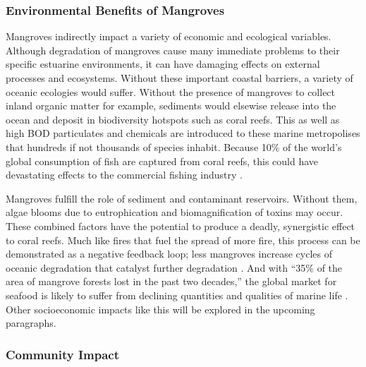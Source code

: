 \subsubsection{Environmental Benefits of Mangroves}

Mangroves indirectly impact a variety of economic and ecological variables. Although degradation of mangroves cause many immediate problems to their specific estuarine environments, it can have damaging effects on external processes and ecosystems. Without these  important coastal barriers, a variety of oceanic ecologies would suffer. Without the presence of mangroves to collect inland organic matter for example, sediments would elsewise release into the ocean and deposit in biodiversity hotspots such as coral reefs. This as well as high BOD particulates and chemicals are introduced to these marine metropolises that hundreds if not thousands of species inhabit. Because 10\% of the world's global consumption of fish are captured from coral reefs, this could have devastating effects to the commercial fishing industry \citep{naylor2000effect}. 

Mangroves fulfill the role of sediment and contaminant reservoirs. Without them, algae blooms due to eutrophication and biomagnification of toxins may occur. These combined factors have the potential to produce a deadly, synergistic effect to coral reefs. Much like fires that fuel the spread of more fire, this process can be demonstrated as a negative feedback loop; less mangroves increase cycles of oceanic degradation that catalyst further degradation \citep{hoegh1999climate}. And with ``35\% of the area of mangrove forests lost in the past two decades,'' the global market for seafood is likely to suffer from declining quantities and qualities of marine life \citep{valiela2001mangrove}. Other socioeconomic impacts like this will be explored in the upcoming paragraphs.

\subsubsection{Community Impact}

